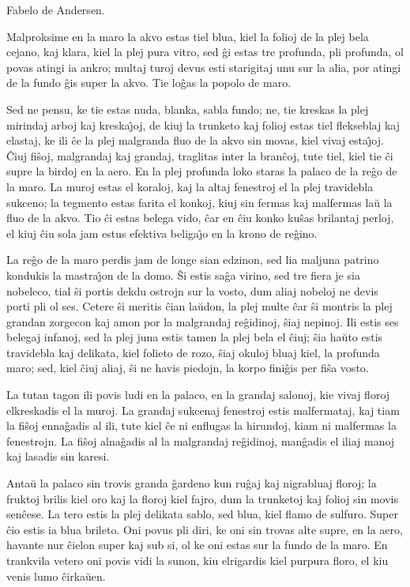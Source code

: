 \begin{center}
\footnotesize Fabelo de Andersen.
\end{center}

   Malproksime en la maro la akvo estas tiel blua, kiel la folioj de la
plej bela cejano, kaj klara, kiel la plej pura vitro, sed \^gi estas
tre profunda, pli profunda, ol povas atingi ia ankro; multaj turoj
devus esti starigitaj unu sur la alia, por atingi de la fundo \^gis
super la akvo. Tie lo\^gas la popolo de maro.

   Sed ne pensu, ke tie estas nuda, blanka, sabla fundo; ne, tie kreskas
la plej mirindaj arboj kaj kreska\^{\j}oj, de kiuj la trunketo kaj
folioj estas tiel flekseblaj kaj elastaj, ke ili \^ce la plej
malgranda fluo de la akvo sin movas, kiel vivaj esta\^{\j}oj. \^Ciuj
fi\^soj, malgrandaj kaj grandaj, traglitas inter la bran\^coj, tute
tiel, kiel tie \^ci supre la birdoj en la aero. En la plej profunda
loko staras la palaco de la re\^go de la maro. La muroj estas el
koraloj, kaj la altaj fenestroj el la plej travidebla sukceno; la
tegmento estas farita el konkoj, kiuj sin fermas kaj malfermas la\u
u la fluo de la akvo. Tio \^ci estas belega vido, \^car en \^ciu
konko ku\^sas brilantaj perloj, el kiuj \^ciu sola jam estus
efektiva beliga\^{\j}o en la krono de re\^gino.

   La re\^go de la maro perdis jam de longe sian edzinon, sed lia maljuna
patrino kondukis la mastra\^{\j}on de la domo. \^Si estis sa\^ga
virino, sed tre fiera je sia nobeleco, tial \^si portis dekdu
ostrojn sur la vosto, dum aliaj nobeloj ne devis porti pli ol ses.
Cetere \^si meritis \^cian la\u udon, la plej multe \^car \^si
montris la plej grandan zorgecon kaj amon por la malgrandaj
re\^gidinoj, \^siaj nepinoj. Ili estis ses belegaj infanoj, sed la
plej juna estis tamen la plej bela el \^ciuj; \^sia ha\u uto estis
travidebla kaj delikata, kiel folieto de rozo, \^siaj okuloj bluaj
kiel, la profunda maro; sed, kiel \^ciuj aliaj, \^si ne havis
piedojn, la korpo fini\^gis per fi\^sa vosto.

   La tutan tagon ili povis ludi en la palaco, en la grandaj salonoj,
kie vivaj floroj elkreskadis el la muroj. La grandaj sukcenaj
fenestroj estis malfermataj, kaj tiam la fi\^soj enna\^gadis al ili,
tute kiel \^ce ni enflugas la hirundoj, kiam ni malfermas la
fenestrojn. La fi\^soj alna\^gadis al la malgrandaj re\^gidinoj,
man\^gadis el iliaj manoj kaj lasadis sin karesi.

   Anta\u u la palaco sin trovis granda \^gardeno kun ru\^gaj kaj nigrabluaj
floroj; la fruktoj brilis kiel oro kaj la floroj kiel fajro, dum la
trunketoj kaj folioj sin movis sen\^cese. La tero estis la plej
delikata sablo, sed blua, kiel flamo de sulfuro. Super \^cio estis
ia blua brileto. Oni povus pli diri, ke oni sin trovas alte supre,
en la aero, havante nur \^cielon super kaj sub si, ol ke oni estas
sur la fundo de la maro. En trankvila vetero oni povis vidi la
sunon, kiu elrigardis kiel purpura floro, el kiu venis lumo
\^cirka\u uen.

